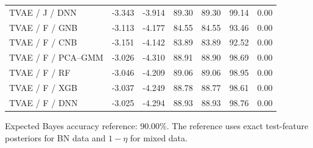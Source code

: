 \documentclass[11pt,letterpaper]{article}
\begin{document}
\begin{table}[H]
\begin{tabular}{lrrrrrr}
TVAE / J / DNN & -3.343 & -3.914 & 89.30 & 89.30 & 99.14 & 0.00\\
TVAE / F / GNB & -3.113 & -4.177 & 84.55 & 84.55 & 93.46 & 0.00\\
TVAE / F / CNB & -3.151 & -4.142 & 83.89 & 83.89 & 92.52 & 0.00\\
TVAE / F / PCA--GMM & -3.026 & -4.310 & 88.91 & 88.90 & 98.69 & 0.00\\
TVAE / F / RF & -3.046 & -4.209 & 89.06 & 89.06 & 98.95 & 0.00\\
TVAE / F / XGB & -3.037 & -4.249 & 88.78 & 88.77 & 98.61 & 0.00\\
TVAE / F / DNN & -3.025 & -4.294 & 88.93 & 88.93 & 98.76 & 0.00\\
\bottomrule\end{tabular}
\end{table}
Expected Bayes accuracy reference: 90.00\%. The reference uses exact test-feature posteriors for BN data and $1-\eta$ for mixed data.
\clearpage
\end{document}
